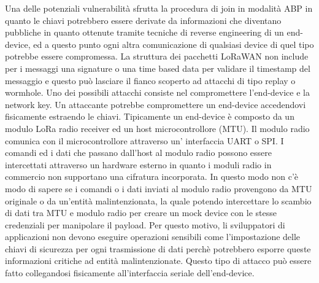 \documentclass[12pt,a4paper,openright,twoside]{report}
\begin{document}
Una delle potenziali vulnerabilit\`a sfrutta la procedura di join in modalit\`a ABP in quanto le chiavi potrebbero essere derivate da informazioni che diventano pubbliche in quanto ottenute tramite tecniche di reverse engineering di un end-device,  ed a questo punto ogni altra comunicazione di qualsiasi device di quel tipo potrebbe essere compromessa. 
La struttura dei pacchetti LoRaWAN non include per i messaggi una signature o una time based data per validare il timestamp del messaggio e questo pu\`o lasciare il fianco scoperto ad attacchi di tipo replay o wormhole. 
Uno dei possibili attacchi consiste nel compromettere l'end-device e la network key. Un attaccante potrebbe compromettere un end-device accedendovi fisicamente estraendo le chiavi. 
Tipicamente un end-device \`e composto da un modulo LoRa radio receiver ed un host microcontrollore (MTU). Il modulo radio comunica con il microcontrollore attraverso un' interfaccia UART o SPI. 
I comandi ed i dati che passano dall'host al modulo radio possono essere intercettati attraverso un hardware esterno in quanto i moduli radio in commercio non supportano una cifratura incorporata.
In questo modo non c'\`e modo di sapere se i comandi o i dati inviati al modulo radio provengono da MTU originale o da un'entit\`a malintenzionata, la quale potendo intercettare lo scambio di dati tra MTU e modulo radio per creare un mock device con le stesse credenziali per manipolare il payload. Per questo motivo, li sviluppatori di applicazioni non devono eseguire operazioni sensibili come l'impostazione delle chiavi di sicurezza per ogni trasmissione di dati perch\`e potrebbero esporre queste informazioni critiche ad entit\`a malintenzionate. Questo tipo di attacco pu\`o essere fatto collegandosi fisicamente all'interfaccia seriale dell'end-device.
\end{document}
